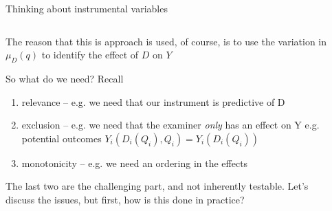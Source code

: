 \documentclass[notes,11pt, aspectratio=169]{beamer}
\newenvironment{wideitemize}{\itemize\addtolength{\itemsep}{10pt}}{\enditemize}
\begin{document}
\begin{frame}{Thinking about instrumental variables}
  \begin{columns}[onlytextwidth, T] %
    \begin{column}{.7\textwidth}
      \begin{wideitemize}
      \item The reason that this is approach is used, of course, is to
        use the variation in $\mu_{D}(q)$ to identify the effect of
        $D$ on $Y$
      \item   So what do we need? Recall
        \begin{enumerate}
          \item  relevance -- e.g. we need that our instrument is predictive of D
          \item exclusion -- e.g. we need that the examiner
            \emph{only} has an effect on Y e.g. potential outcomes
            $Y_{i}(D_{i}(Q_{i}), Q_{i}) = Y_{i}(D_{i}(Q_{i}))$
          \item monotonicity -- e.g. we need an ordering in the effects
          \end{enumerate}
        \item The last two are the challenging part, and not
          inherently testable. Let's discuss the issues, but first,
          how is this done in practice?
      \end{wideitemize}
    \end{column}%
    \hfill%
    \begin{column}{.5\textwidth}
    \end{column}%
  \end{columns}
\end{frame}
\end{document}
